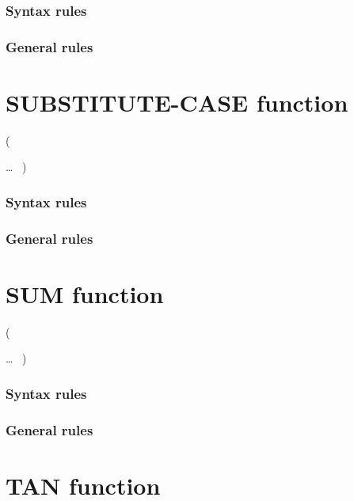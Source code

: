 \subsubsection{Syntax rules}

\subsubsection{General rules}

\section{SUBSTITUTE-CASE function}

\begin{syntax}[\gnucobolcolour]
    ( \argument
  \begin{1=}
    \argument \argument
  \end{1=}\ldots\ {}
  )
\end{syntax}

\subsubsection{Syntax rules}

\subsubsection{General rules}

\section{SUM function}

\begin{syntax}
    (
  \begin{1=}
    \argument
  \end{1=}\ldots
  \ {})
\end{syntax}

\subsubsection{Syntax rules}

\subsubsection{General rules}

\section{TAN function}

